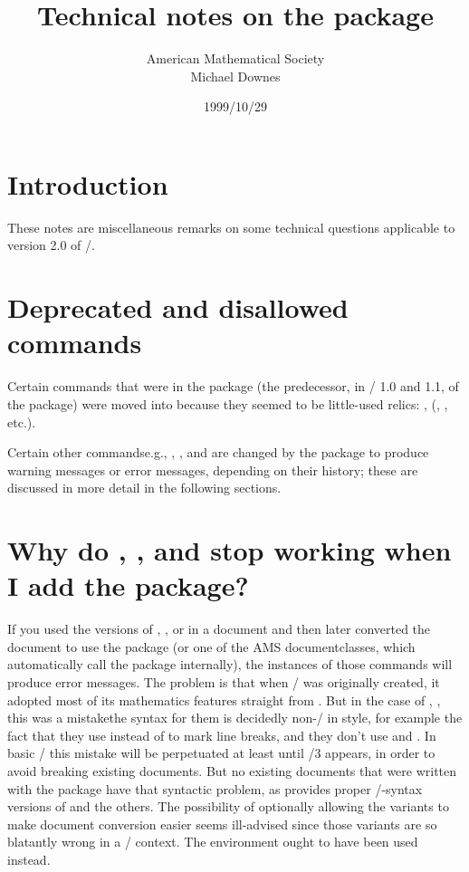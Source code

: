 \documentclass{amsdtx}
\title{Technical notes on the \pkg{amsmath} package}
\author{American Mathematical Society\\Michael Downes}
\date{1999/10/29}
\begin{document}
\maketitle

\section{Introduction}

These notes are miscellaneous remarks on some technical questions
applicable to version 2.0 of \amslatex/.

\section{Deprecated and disallowed commands}

Certain commands that were in the  package (the predecessor,
in \amslatex/ 1.0 and 1.1, of the  package) were moved into
 because they seemed to be little-used relics:
,  (, , etc.).

Certain other commands\mdash e.g., , , and
\mdash are changed by the  package to produce
warning messages or error messages, depending on their history; these
are discussed in more detail in the following sections.

\section{Why do , , and  stop working
when I add the  package?}

If you used the  versions of , , or
 in a document and then later converted the document to use
the  package (or one of the AMS documentclasses, which
automatically call the  package internally), the instances
of those commands will produce error messages. The problem is that when
\latex/ was originally created, it adopted most of its mathematics
features straight from . But in the case of ,
,  this was a mistake\mdash the 
syntax for them is decidedly non-\latex/ in style, for example the fact
that they use  instead of \cn{\\} to mark line breaks, and they
don't use  and . In basic \latex/ this mistake will be
perpetuated at least until \latex/3 appears, in order to avoid breaking
existing documents. But no existing documents that were written with the
 package have that syntactic problem, as 
provides proper \latex/-syntax versions of  and the others.
The possibility of optionally allowing the  variants to
make document conversion easier seems ill-advised since those variants
are so blatantly wrong in a \latex/ context. The  environment
ought to have been used instead.
\end{document}
